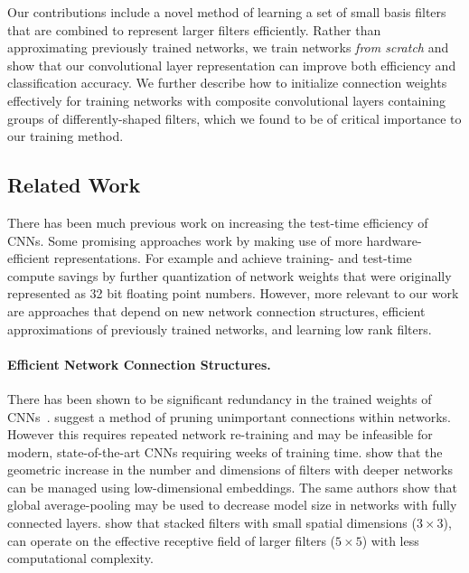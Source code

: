 \documentclass[thesis]{subfiles}
\begin{document}
    Our contributions include a novel method of learning a set of small basis filters that are combined to represent larger filters efficiently. Rather than approximating previously trained networks, we train networks \emph{from scratch} and show that our convolutional layer representation can improve both efficiency and classification accuracy. We further describe how to initialize connection weights effectively for training networks with composite convolutional layers containing groups of differently-shaped filters, which we found to be of critical importance to our training method.
    
    \subsection{Related Work}
    \label{relatedwork}
    There has been much previous work on increasing the test-time efficiency of CNNs. Some promising approaches work by making use of more hardware-efficient representations. For example \citet{1502.02551v1} and \citet{vanhoucke2011improving} achieve training- and test-time compute savings by further quantization of network weights that were originally represented as 32 bit floating point numbers. However, more relevant to our work are approaches that depend on new network connection structures, efficient approximations of previously trained networks, and learning low rank filters. 
    
    \paragraph{Efficient Network Connection Structures.}
    There has been shown to be significant redundancy in the trained weights of CNNs~\citep{Denil2013predicting}. \citet{lecun1989optimal} suggest a method of pruning unimportant connections within networks. However this requires repeated network re-training and may be infeasible for modern, state-of-the-art CNNs requiring weeks of training time. \citet{Lin2013NiN} show that the geometric increase in the number and dimensions of filters with deeper networks can be managed using low-dimensional embeddings. The same authors show that global average-pooling may be used to decrease model size in networks with fully connected layers. \citet{Simonyan2014verydeep} show that stacked filters with small spatial dimensions (\eg $3\times 3$), can operate on the effective receptive field of larger filters (\eg $5 \times 5$) with less computational complexity.
    
\end{document}
